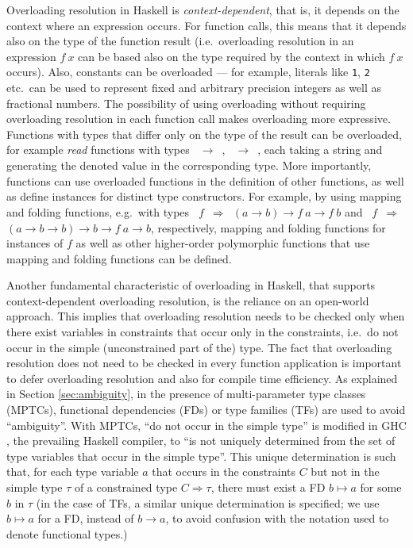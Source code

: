 Overloading resolution in Haskell is {\em context-dependent}, that is,
it depends on the context where an expression occurs. For function
calls, this means that it depends also on the type of the function
result (i.e.~overloading resolution in an expression $f\:x$ can be
based also on the type required by the context in which $f\:x$
occurs). Also, constants can be overloaded --- for example, literals
like {\tt 1}, {\tt 2} etc.~can be used to represent fixed and
arbitrary precision integers as well as fractional numbers. The
possibility of using overloading without requiring overloading
resolution in each function call makes overloading more
expressive. Functions with types that differ only on the type of the
result can be overloaded, for example {\em read\/} functions with
types {\tt \String\ $\rightarrow$ \Bool}, {\tt \String\ $\rightarrow$
  \Int}, each taking a string and generating the denoted value in the
corresponding type.  More importantly, functions can use overloaded
functions in the definition of other functions, as well as define
instances for distinct type constructors. For example, by using
mapping and folding functions, e.g.~with types {\tt \Functor\ $f$
  $\Rightarrow$ $(a\rightarrow b)\rightarrow f\:a\rightarrow f\:b$}
and {\tt \Foldable\ $f$ $\Rightarrow$ $(a\rightarrow b\rightarrow
  b)\rightarrow b\rightarrow f\:a\rightarrow b$}, respectively,
mapping and folding functions for instances of $f$ as well as other
higher-order polymorphic functions that use mapping and folding
functions can be defined.


Another fundamental characteristic of overloading in Haskell, that
supports context-dependent overloading resolution, is the reliance on
an open-world approach.
This implies that overloading resolution needs to be checked only when
there exist variables in constraints that occur only in the
constraints, i.e.~do not occur in the simple (unconstrained part of
the) type. The fact that overloading resolution does not need to be
checked in every function application is important to defer
overloading resolution and also for compile time efficiency. As
explained in Section \ref{sec:ambiguity}, in the presence of
multi-parameter type classes (MPTCs), functional dependencies (FDs)
\cite{Type-classes-with-FDs-MarkJones00,Jones:2008} or type families
(TFs) \cite{Chakravarty2005,Schrijvers:2008} are used to avoid
``ambiguity''.  With MPTCs, ``do not occur in the simple type'' is
modified in GHC \cite{GHC}, the prevailing Haskell compiler, to ``is
not uniquely determined from the set of type variables that occur in
the simple type''. This unique determination is such that, for each
type variable $a$ that occurs in the constraints $C$ but not in the
simple type $\tau$ of a constrained type $C\Rightarrow \tau$, there
must exist a FD $b \mapsto a$ for some $b$ in $\tau$ (in the case of
TFs, a similar unique determination is specified; we use $b \mapsto a$
for a FD, instead of $b \rightarrow a$, to avoid confusion with the
notation used to denote functional types.)

